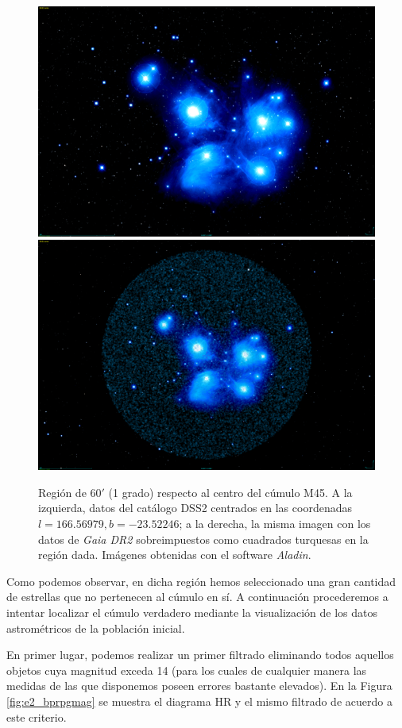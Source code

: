 \documentclass[a4paper,fleqn,usenatbib]{mnras}
\begin{document}
\begin{figure}
  \centering
  \includegraphics[width=0.81\linewidth]{img/pleyades}
  \includegraphics[width=0.81\linewidth]{img/pleyades_gaia}
  \caption{Región de $60'$ (1 grado) respecto al centro del cúmulo M45. A la izquierda, datos del catálogo \ac{DSS2} centrados en las coordenadas $l=166.56979, b=-23.52246$; a la derecha, la misma imagen con los datos de \emph{Gaia DR2} sobreimpuestos como cuadrados turquesas en la región dada. Imágenes obtenidas con el software \emph{Aladin}.}
  \label{fig:e2_m45}
\end{figure}

Como podemos observar, en dicha región hemos seleccionado una gran cantidad de estrellas que no pertenecen al cúmulo en sí. A continuación procederemos a intentar localizar el cúmulo verdadero mediante la visualización de los datos astrométricos de la población inicial.

En primer lugar, podemos realizar un primer filtrado eliminando todos aquellos objetos cuya magnitud exceda 14 (para los cuales de cualquier manera las medidas de las que disponemos poseen errores bastante elevados). En la Figura \ref{fig:e2_bprpgmag} se muestra el diagrama HR y el mismo filtrado de acuerdo a este criterio.
\end{document}
